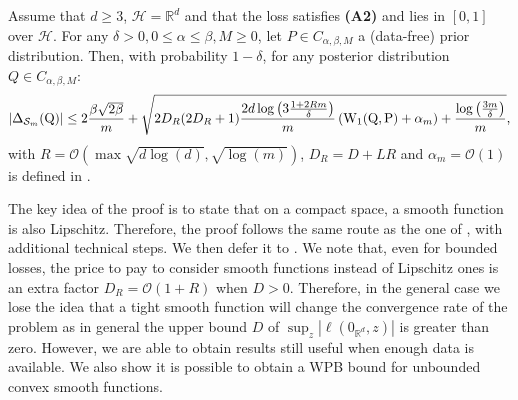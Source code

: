 \begin{theorem}
\label{th: main_gaussian_smooth}
Assume that $d\geq 3$, $\mathcal{H}= \mathbb{R}^d$ and that the loss satisfies \textbf{(A2)} and lies in $[0,1]$ over $\mathcal{H}$. For any $\delta>0, 0\leq \alpha\leq \beta, M\geq 0$, let $P\in C_{\alpha,\beta,M}$ a (data-free) prior distribution. Then, with probability $1-\delta$, for any posterior distribution $Q\in C_{\alpha,\beta,M}$:
\begin{align*}
|\Delta_{\mathcal{S}_m}(\mathrm{Q})| \leq 2 \frac{\beta\sqrt{2\beta}}{m} + \sqrt{2D_R(2D_R+1)\frac{2d\log\left(3\frac{1 +2Rm }{\delta}\right)}{m} \left(\mathrm{W}_{1}(\mathrm{Q},\mathrm{P})+ \alpha_m \right) + \frac{\log\left( \frac{3m}{\delta} \right)}{m} },
\end{align*}
with $R= \mathcal{O}\left( \max \sqrt{d\log(d)}, \sqrt{\log(m)}   \right)$,  $D_R= D+LR$ and $\alpha_m= \mathcal{O}(1)$ is defined in .
\end{theorem}
The key idea of the proof is to state that on a compact space, a smooth function is also Lipschitz. Therefore, the proof follows the same route as the one of , with additional technical steps. We then defer it to .
We note that, even for bounded losses, the price to pay to consider smooth functions instead of Lipschitz ones is an extra factor $D_R= \mathcal{O}(1+R)$ when $D>0$. Therefore, in the general case we lose the idea that a tight smooth function will change the convergence rate of the problem as in general the upper bound $D$ of  $\sup_{z}|\ell(0_{\mathbb{R}^d},z)|$ is greater than zero. However, we are able to obtain results still useful when enough data is available. We also show it is possible to obtain a WPB bound for unbounded convex smooth functions.

